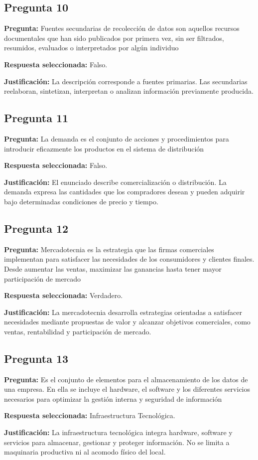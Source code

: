 {\subsection{Pregunta 10}
\textbf{Pregunta:} Fuentes secundarias de recolección de datos son aquellos recursos documentales que han sido publicados por primera vez, sin ser filtrados, resumidos, evaluados o interpretados por algún individuo
\par\textbf{Respuesta seleccionada:} Falso.
\par\textbf{Justificación:} La descripción corresponde a fuentes primarias. Las secundarias reelaboran, sintetizan, interpretan o analizan información previamente producida.
\subsection{Pregunta 11}
\textbf{Pregunta:} La demanda es el conjunto de acciones y procedimientos para introducir eficazmente los productos en el sistema de distribución
\par\textbf{Respuesta seleccionada:} Falso.
\par\textbf{Justificación:} El enunciado describe comercialización o distribución. La demanda expresa las cantidades que los compradores desean y pueden adquirir bajo determinadas condiciones de precio y tiempo.
\subsection{Pregunta 12}
\textbf{Pregunta:} Mercadotecnia es la estrategia que las firmas comerciales implementan para satisfacer las necesidades de los consumidores y clientes finales. Desde aumentar las ventas, maximizar las ganancias hasta tener mayor participación de mercado
\par\textbf{Respuesta seleccionada:} Verdadero.
\par\textbf{Justificación:} La mercadotecnia desarrolla estrategias orientadas a satisfacer necesidades mediante propuestas de valor y alcanzar objetivos comerciales, como ventas, rentabilidad y participación de mercado.
\subsection{Pregunta 13}
\textbf{Pregunta:} Es el conjunto de elementos para el almacenamiento de los datos de una empresa. En ella se incluye el hardware, el software y los diferentes servicios necesarios para optimizar la gestión interna y seguridad de información
\par\textbf{Respuesta seleccionada:} Infraestructura Tecnológica.
\par\textbf{Justificación:} La infraestructura tecnológica integra hardware, software y servicios para almacenar, gestionar y proteger información. No se limita a maquinaria productiva ni al acomodo físico del local.
}
